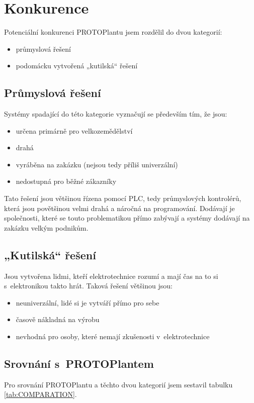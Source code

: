 \chapter{Konkurence}
Potenciální konkurenci PROTOPlantu jsem rozdělil do dvou kategorií:
\begin{itemize}
    \item průmyslová řešení
    \item podomácku vytvořená „kutilská“ řešení
\end{itemize}

\section{Průmyslová řešení}
Systémy spadající do této kategorie vyznačují se především tím, že jsou:
\begin{itemize}
    \item určena primárně pro velkozemědělství
    \item drahá
    \item vyráběna na zakázku (nejsou tedy příliš univerzální)
    \item nedostupná pro běžné zákazníky
\end{itemize}

Tato řešení jsou většinou řízena pomocí PLC, tedy průmyslových kontrolérů, která jsou povětšinou velmi drahá a náročná na programování.
Dodávají je společnosti, které se touto problematikou přímo zabývají a systémy dodávají na zakázku velkým podnikům.

\section{„Kutilská“ řešení}
Jsou vytvořena lidmi, kteří elektrotechnice rozumí a mají čas na to si s~elektronikou takto hrát.
Taková řešení většinou jsou:
\begin{itemize}
    \item neuniverzální, lidé si je vytváří přímo pro sebe
    \item časově nákladná na výrobu
    \item nevhodná pro osoby, které nemají zkušenosti v~elektrotechnice 
\end{itemize}

\section{Srovnání s~PROTOPlantem}
Pro srovnání PROTOPlantu a těchto dvou kategorií jsem sestavil tabulku \ref{tab:COMPARATION}.

